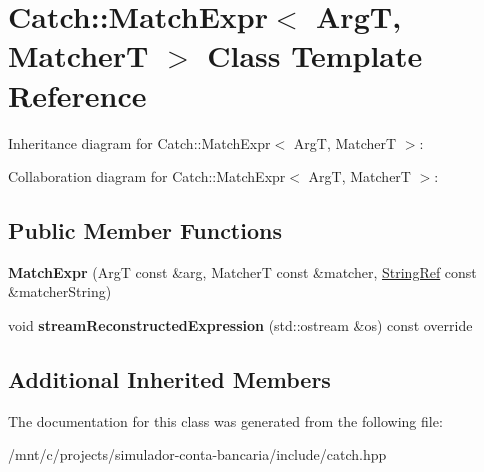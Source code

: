 \hypertarget{classCatch_1_1MatchExpr}{}\section{Catch\+:\+:Match\+Expr$<$ ArgT, MatcherT $>$ Class Template Reference}
\label{classCatch_1_1MatchExpr}


Inheritance diagram for Catch\+:\+:Match\+Expr$<$ ArgT, MatcherT $>$\+:


Collaboration diagram for Catch\+:\+:Match\+Expr$<$ ArgT, MatcherT $>$\+:
\subsection*{Public Member Functions}
\begin{DoxyCompactItemize}
\item 
\mbox{\label{classCatch_1_1MatchExpr_ae55ee9bf46c8676c65e9df291a98c345}} 
{\bfseries Match\+Expr} (ArgT const \&arg, MatcherT const \&matcher, \hyperlink{classCatch_1_1StringRef}{String\+Ref} const \&matcher\+String)
\item 
\mbox{\label{classCatch_1_1MatchExpr_ad3e41adb597750b2219bb37e51185629}} 
void {\bfseries stream\+Reconstructed\+Expression} (std\+::ostream \&os) const override
\end{DoxyCompactItemize}
\subsection*{Additional Inherited Members}


The documentation for this class was generated from the following file\+:\begin{DoxyCompactItemize}
\item 
/mnt/c/projects/simulador-\/conta-\/bancaria/include/catch.\+hpp\end{DoxyCompactItemize}
